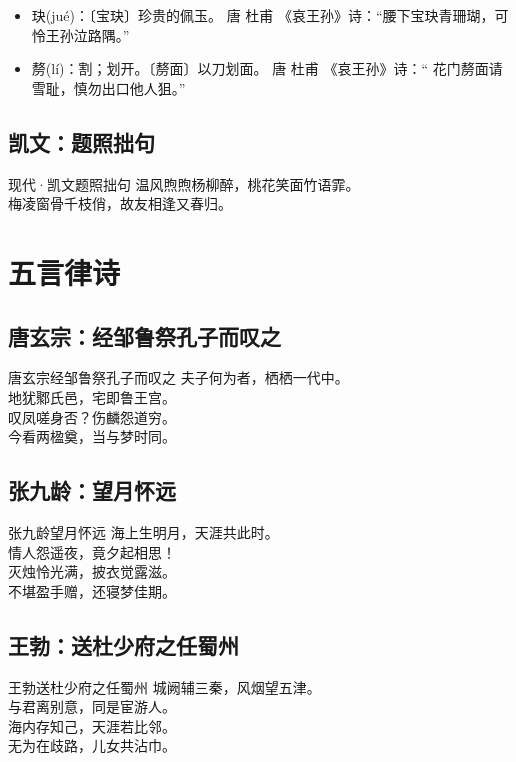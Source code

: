\documentclass[12pt,oneside,a5paper]{book}
\begin{document}
\begin{itemize}
\item 玦(jué)：〔宝玦〕珍贵的佩玉。  唐 杜甫 《哀王孙》诗：“腰下宝玦青珊瑚，可怜王孙泣路隅。” 
\item 剺(lí)：割；划开。〔剺面〕以刀划面。 唐 杜甫 《哀王孙》诗：“ 花门剺面请雪耻，慎勿出口他人狙。”  
\end{itemize}

\chapter*{凯文：题照拙句}

\begin{poemzh}{现代·凯文}{题照拙句}
温风煦煦杨柳醉，桃花笑面竹语霏。\\
梅凌窗骨千枝俏，故友相逢又春归。\\
\end{poemzh}

\part{五言律诗}
\chapter{唐玄宗：经邹鲁祭孔子而叹之}
\begin{poemzh}{唐玄宗}{经邹鲁祭孔子而叹之}
夫子何为者，栖栖一代中。\\
地犹鄹氏邑，宅即鲁王宫。\\
叹凤嗟身否？伤麟怨道穷。\\
今看两楹奠，当与梦时同。\\ 
\end{poemzh}

\chapter{张九龄：望月怀远}
\begin{poemzh}{张九龄}{望月怀远}
海上生明月，天涯共此时。\\
情人怨遥夜，竟夕起相思！\\
灭烛怜光满，披衣觉露滋。\\
不堪盈手赠，还寝梦佳期。\\ 
\end{poemzh}

\chapter{王勃：送杜少府之任蜀州}
\begin{poemzh}{王勃}{送杜少府之任蜀州}
城阙辅三秦，风烟望五津。\\
与君离别意，同是宦游人。\\
海内存知己，天涯若比邻。\\
无为在歧路，儿女共沾巾。\\ 
\end{poemzh}
\end{document}

